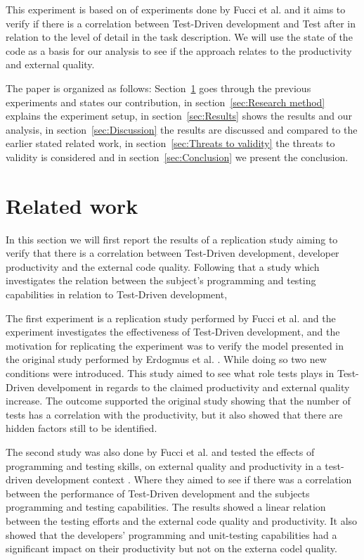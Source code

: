 \documentclass{sig-alternate-05-2015}
\begin{document}
This experiment is based on of experiments done by Fucci et al. \cite{fucci2} and it aims to verify if there is a correlation between Test-Driven development and Test after in relation to the level of detail in the task description. We will use the state of the code as a basis for our analysis to see if the approach relates to the productivity and external quality.

The paper is organized as follows: Section~\ref{sec:Related work} goes through the previous experiments and states our contribution, in section~\ref{sec:Research method} explains the experiment setup, in section~\ref{sec:Results} shows the results and our analysis, in section~\ref{sec:Discussion} the results are discussed and compared to the earlier stated related work, in section~\ref{sec:Threats to validity} the threats to validity is considered and in section~\ref{sec:Conclusion} we present the conclusion. 

\section{Related work}
\label{sec:Related work}
In this section we will first report the results of a replication study aiming to verify that there is a correlation between Test-Driven development, developer productivity and the external code quality. Following that a study which investigates the relation between the subject's programming and testing capabilities in relation to Test-Driven development,

The first experiment is a replication study performed by  Fucci et al. \cite{fucci2} and the experiment investigates the effectiveness of Test-Driven development, and the motivation for replicating the experiment was to verify the model presented in the original study performed by Erdogmus et al. \cite{erdogmus1}. While doing so two new conditions were introduced. This study aimed to see what role tests plays in Test-Driven develpoment in regards to the claimed productivity and external quality increase. The outcome supported the original study showing that the number of tests has a correlation with the productivity, but it also showed that there are hidden factors still to be identified.

The second study was also done by Fucci et al. and tested the effects of programming and testing skills, on external quality and productivity in a test-driven development context \cite{fucci1}. Where they aimed to see if there was a correlation between the performance of Test-Driven development and the subjects programming and testing capabilities. The results showed a linear relation between the testing efforts and the external code quality and productivity. It also showed that the developers' programming and unit-testing capabilities had a significant impact on their productivity but not on the externa codel quality.
\end{document}
